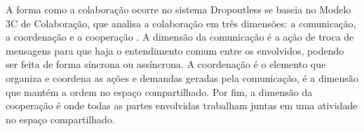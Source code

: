 \documentclass[12pt]{article}
\begin{document}



A forma como a colaboração ocorre no sistema Dropoutless se baseia no Modelo 3C de Colaboração, que analisa a colaboração em três dimensões: a comunicação, a coordenação e a cooperação \cite{fuks2011teorias}. A dimensão da comunicação é a ação de troca de mensagens para que haja o entendimento comum entre os envolvidos, podendo ser feita de forma síncrona ou assíncrona. A coordenação é o elemento que organiza e coordena as ações e demandas geradas pela comunicação, é a dimensão que mantém a ordem no espaço compartilhado. Por fim, a dimensão da cooperação é onde todas as partes envolvidas trabalham juntas em uma atividade no espaço compartilhado.
\end{document}

